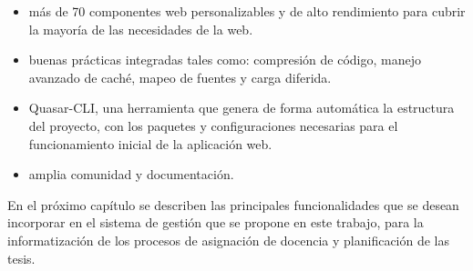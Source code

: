 \begin{itemize}
    \item más de 70 componentes web personalizables y de alto rendimiento para cubrir la 
    mayoría de las necesidades de la web.
    \item buenas prácticas integradas tales como: compresión de código, 
    manejo avanzado de caché, mapeo de fuentes y carga diferida. 
    \item Quasar-CLI, una herramienta que genera de forma automática la estructura del 
    proyecto, con los paquetes y configuraciones necesarias para el 
    funcionamiento inicial de la aplicación web.
    \item amplia comunidad y documentación.

\end{itemize}


En el próximo capítulo se describen las principales funcionalidades
que se desean incorporar en el sistema de gestión que se propone en este trabajo, 
para la informatización de los procesos de asignación de docencia y planificación de 
las tesis.
 







